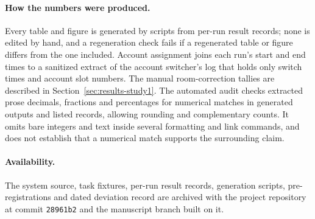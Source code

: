 \paragraph{How the numbers were produced.} Every table and figure is generated by scripts from per-run result records; none is edited by hand, and a regeneration check fails if a regenerated table or figure differs from the one included. Account assignment joins each run's start and end times to a sanitized extract of the account switcher's log that holds only switch times and account slot numbers. The manual room-correction tallies are described in Section~\ref{sec:results-study1}. The automated audit checks extracted prose decimals, fractions and percentages for numerical matches in generated outputs and listed records, allowing rounding and complementary counts. It omits bare integers and text inside several formatting and link commands, and does not establish that a numerical match supports the surrounding claim.

\paragraph{Availability.} The system source, task fixtures, per-run result records, generation scripts, pre-registrations and dated deviation record are archived with the project repository at commit \texttt{28961b2} and the manuscript branch built on it.

